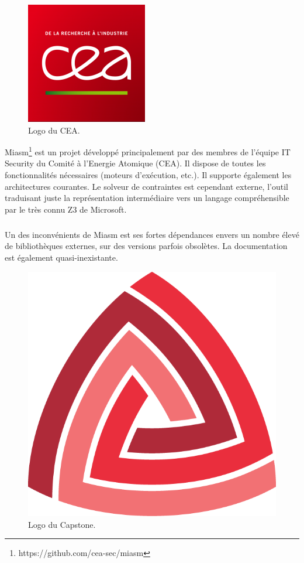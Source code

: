 \begin{figure}[h]
    \centering
    \includegraphics[scale=0.3]{images/cea.png}
    \caption{Logo du CEA.}
\end{figure}
Miasm\footnote{https://github.com/cea-sec/miasm} est un projet développé principalement par des membres de l'équipe IT Security du Comité à l'Energie Atomique (CEA).
Il dispose de toutes les fonctionnalités nécessaires (moteurs d'exécution, etc.). Il supporte également les architectures courantes. Le solveur de contraintes est
cependant externe, l'outil traduisant juste la représentation intermédiaire vers un langage compréhensible par le très connu Z3 de Microsoft.
\subparagraph{}
Un des inconvénients de Miasm est ses fortes dépendances envers un nombre élevé de bibliothèques externes, sur des versions parfois obsolètes. La documentation est également
quasi-inexistante.
\newpage
{}
\begin{figure}[h]
    \centering
    \includegraphics[scale=0.3]{images/capstone.png}
    \caption{Logo du Capstone.}
\end{figure}
